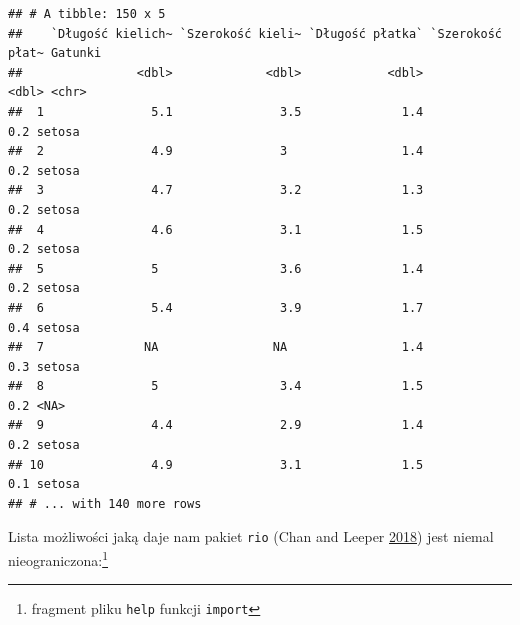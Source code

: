 \documentclass[
]{book}
\theoremstyle{plain}
\theoremstyle{definition}
\theoremstyle{definition}
\theoremstyle{definition}
\theoremstyle{definition}
\theoremstyle{remark}
\begin{document}
\begin{verbatim}
## # A tibble: 150 x 5
##    `Długość kielich~ `Szerokość kieli~ `Długość płatka` `Szerokość płat~ Gatunki
##                <dbl>             <dbl>            <dbl>            <dbl> <chr>  
##  1               5.1               3.5              1.4              0.2 setosa 
##  2               4.9               3                1.4              0.2 setosa 
##  3               4.7               3.2              1.3              0.2 setosa 
##  4               4.6               3.1              1.5              0.2 setosa 
##  5               5                 3.6              1.4              0.2 setosa 
##  6               5.4               3.9              1.7              0.4 setosa 
##  7              NA                NA                1.4              0.3 setosa 
##  8               5                 3.4              1.5              0.2 <NA>   
##  9               4.4               2.9              1.4              0.2 setosa 
## 10               4.9               3.1              1.5              0.1 setosa 
## # ... with 140 more rows
\end{verbatim}

Lista możliwości jaką daje nam pakiet \texttt{rio} (Chan and Leeper \protect\hyperlink{ref-R-rio}{2018}) jest niemal nieograniczona:\footnote{fragment pliku \texttt{help} funkcji \texttt{import}}
\end{document}
